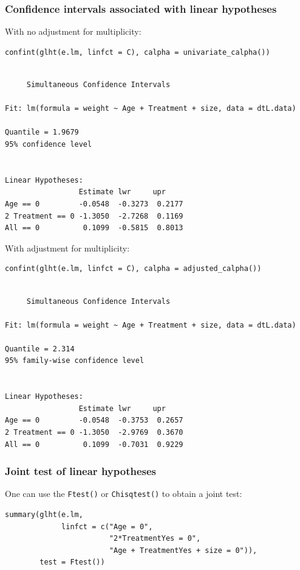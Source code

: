 \documentclass{article}
\begin{document}
\subsubsection{Confidence intervals associated with linear hypotheses}
\label{sec:org5c356ec}

With no adjustment for multiplicity:
\lstset{language=r,label= ,caption= ,captionpos=b,numbers=none}
\begin{lstlisting}
confint(glht(e.lm, linfct = C), calpha = univariate_calpha())
\end{lstlisting}

\begin{verbatim}

	 Simultaneous Confidence Intervals

Fit: lm(formula = weight ~ Age + Treatment + size, data = dtL.data)

Quantile = 1.9679
95% confidence level
 

Linear Hypotheses:
                 Estimate lwr     upr    
Age == 0         -0.0548  -0.3273  0.2177
2 Treatment == 0 -1.3050  -2.7268  0.1169
All == 0          0.1099  -0.5815  0.8013
\end{verbatim}

With adjustment for multiplicity:
\lstset{language=r,label= ,caption= ,captionpos=b,numbers=none}
\begin{lstlisting}
confint(glht(e.lm, linfct = C), calpha = adjusted_calpha())
\end{lstlisting}

\begin{verbatim}

	 Simultaneous Confidence Intervals

Fit: lm(formula = weight ~ Age + Treatment + size, data = dtL.data)

Quantile = 2.314
95% family-wise confidence level
 

Linear Hypotheses:
                 Estimate lwr     upr    
Age == 0         -0.0548  -0.3753  0.2657
2 Treatment == 0 -1.3050  -2.9769  0.3670
All == 0          0.1099  -0.7031  0.9229
\end{verbatim}

\subsubsection{Joint test of linear hypotheses}
\label{sec:orgb6382f0}

One can use the \texttt{Ftest()} or \texttt{Chisqtest()} to obtain a joint test:
\lstset{language=r,label= ,caption= ,captionpos=b,numbers=none}
\begin{lstlisting}
summary(glht(e.lm, 
             linfct = c("Age = 0",
                        "2*TreatmentYes = 0",
                        "Age + TreatmentYes + size = 0")), 
        test = Ftest())
\end{lstlisting}
\end{document}
